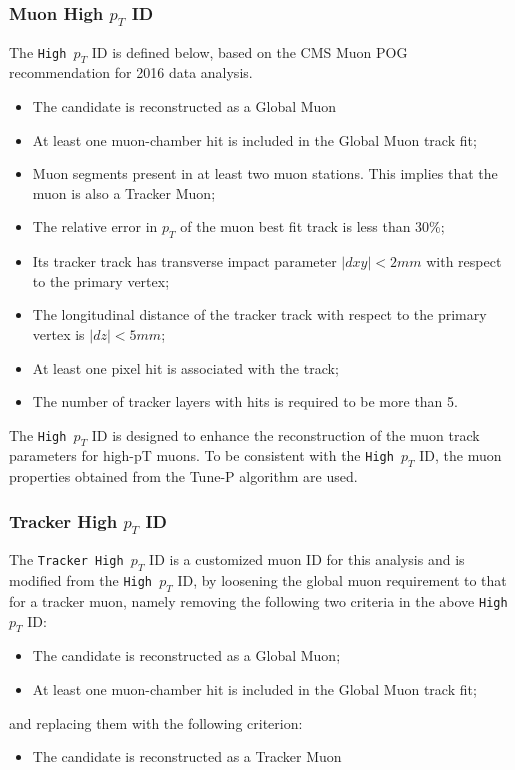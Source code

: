 \subsubsection{Muon High $p_T$ ID}
The \texttt{High $p_T$} ID is defined below, based on the CMS Muon POG recommendation for 2016 data analysis.
\begin{itemize}
\item  The candidate is reconstructed as a Global Muon 
\item  At least one muon-chamber hit is included in the Global Muon track fit;
\item  Muon segments present in at least two muon stations. This implies that the muon is also a Tracker Muon; 
\item  The relative error in $p_T$ of the muon best fit track is less than 30\%;
\item  Its tracker track has transverse impact parameter $|dxy| < 2 mm$ with respect to the primary vertex;
\item  The longitudinal distance of the tracker track with respect to the primary vertex is $|dz| < 5 mm$;
\item  At least one pixel hit is associated with the track;
\item  The number of tracker layers with hits is required to be more than 5.
\end{itemize}

The \texttt{High $p_T$} ID is designed to enhance the reconstruction of the muon track parameters for high-pT muons. To be consistent with the \texttt{High $p_T$} ID, the muon properties obtained from the Tune-P algorithm are used.

\subsubsection{Tracker High $p_T$ ID}
The \texttt{Tracker High $p_T$} ID is a customized muon ID for this analysis and is modified from the \texttt{High $p_T$} ID, by loosening the global muon requirement to that for a tracker muon, namely removing the following two criteria in the above \texttt{High $p_T$} ID:
\begin{itemize}
\item  The candidate is reconstructed as a Global Muon;
\item  At least one muon-chamber hit is included in the Global Muon track fit;
\end{itemize}
and replacing them with the following criterion:
\begin{itemize}
\item  The candidate is reconstructed as a Tracker Muon 
\end{itemize}

